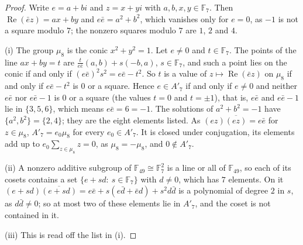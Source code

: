 \documentclass[11pt,a4paper]{amsart}
\theoremstyle{remark}
\newcommand{\F}{\mathbb{F}}
\begin{document}
\begin{proof}
Write $e=a+bi$ and $z=x+yi$ with $a,b,x,y\in\F_7$. Then $\operatorname{Re}(\bar ez)=ax+by$ and $e\bar e=a^2+b^2$,
which vanishes only for $e=0$, as $-1$ is not a square modulo $7$; the nonzero squares modulo $7$ are $1$, $2$ and
$4$.

(i) The group $\mu_8$ is the conic $x^2+y^2=1$. Let $e\ne0$ and $t\in\F_7$. The points of the line $ax+by=t$ are
$\frac t{e\bar e}(a,b)+s(-b,a)$, $s\in\F_7$, and such a point lies on the conic if and only if
$(e\bar e)^2s^2=e\bar e-t^2$. So $t$ is a value of $z\mapsto\operatorname{Re}(\bar ez)$ on $\mu_8$ if and only if
$e\bar e-t^2$ is $0$ or a square. Hence $e\in A'_7$ if and only if $e\ne0$ and neither $e\bar e$ nor $e\bar e-1$ is
$0$ or a square (the values $t=0$ and $t=\pm1$), that is, $e\bar e$ and $e\bar e-1$ lie in $\{3,5,6\}$, which means
$e\bar e=6=-1$. The solutions of $a^2+b^2=-1$ have $\{a^2,b^2\}=\{2,4\}$; they are the eight elements listed. As
$(ez)\overline{(ez)}=e\bar e$ for $z\in\mu_8$, $A'_7=e_0\mu_8$ for every $e_0\in A'_7$. It is closed under
conjugation, its elements add up to $e_0\sum_{z\in\mu_8}z=0$, as $\mu_8=-\mu_8$, and
$0\notin A'_7$.

(ii) A nonzero additive subgroup of $\F_{49}\cong\F_7^2$ is a line or all of $\F_{49}$, so each of its cosets contains
a set $\{e+sd:\ s\in\F_7\}$ with $d\ne0$, which has $7$ elements. On it $(e+sd)\overline{(e+sd)}=e\bar e+s(e\bar d+\bar
ed)+s^2d\bar d$ is a polynomial of degree $2$ in $s$, as $d\bar d\ne0$; so at most two of these elements lie in
$A'_7$, and the coset is not contained in it.

(iii) This is read off the list in (i).


\end{proof}
\end{document}
